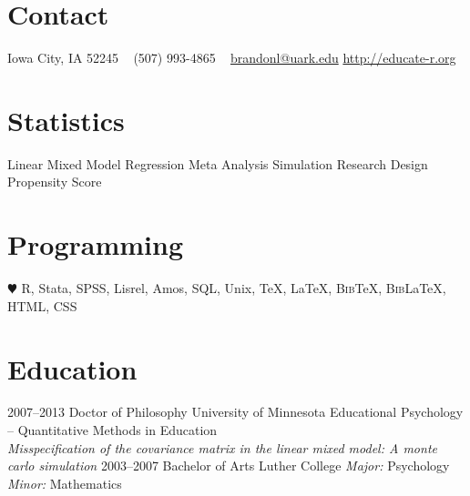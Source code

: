 \documentclass[]{friggeri-cv} %
\begin{document}


\begin{aside} %
\section{Contact}
Iowa City, IA  52245
~
(507) 993-4865
~
\href{mailto:brandonl@uark.edu}{brandonl@uark.edu}
\href{http://educate-r.org}{http://educate-r.org}

\section{Statistics}
Linear Mixed Model
Regression
Meta Analysis
Simulation
Research Design
Propensity Score

\section{Programming}
{\color{green} $\varheartsuit$} R, Stata, SPSS, 
Lisrel, Amos, SQL, 
Unix, \TeX{}, \LaTeX{}, 
B\textsc{ib}\TeX{}, B\textsc{ib}\LaTeX{},
HTML, CSS
\end{aside}


\section{Education}

\begin{entrylist}
\entry
{2007--2013}
{Doctor {\normalfont of Philosophy}}
{University of Minnesota}
{Educational Psychology -- Quantitative Methods in Education \\ \emph{Misspecification of the covariance matrix in the linear mixed model: A monte carlo simulation}} %
\entry
{2003--2007}
{Bachelor {\normalfont of Arts}}
{Luther College}
{\emph{Major:} Psychology \\ \emph{Minor:} Mathematics}
\end{entrylist}
\end{document}
